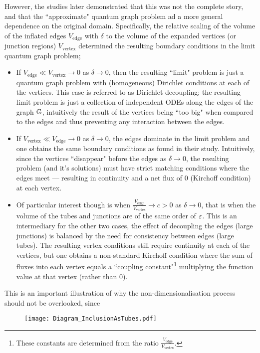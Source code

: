 However, the studies  later demonstrated that this was not the complete story, and that the ``approximate" quantum graph problem ad a more general dependence on the original domain.
Specifically, the relative scaling of the volume of the inflated edges $V_{\mathrm{edge}}$ with $\delta$ to the volume of the expanded vertices (or junction regions) $V_{\mathrm{vertex}}$ determined the resulting boundary conditions in the limit quantum graph problem;
\begin{itemize}
	\item If $V_{\mathrm{edge}}\ll V_{\mathrm{vertex}}\rightarrow0$ as $\delta\rightarrow0$, then the resulting ``limit" problem is just a quantum graph problem with (homogeneous) Dirichlet conditions at each of the vertices.
	This case is referred to as Dirichlet decoupling; the resulting limit problem is just a collection of independent ODEs along the edges of the graph $\mathbb{G}$, intuitively the result of the vertices being ``too big" when compared to the edges and thus preventing any interaction between the edges.
	\item If $V_{\mathrm{vertex}}\ll V_{\mathrm{edge}}\rightarrow0$ as $\delta\rightarrow0$, the edges dominate in the limit problem and one obtains the same boundary conditions as  found in their study.
	Intuitively, since the vertices ``disappear" before the edges as $\delta\rightarrow0$, the resulting problem (and it's solutions) must have strict matching conditions where the edges meet --- resulting in continuity and a net flux of 0 (Kirchoff condition) at each vertex.
	\item Of particular interest though is when $\frac{V_{\mathrm{edge}}}{V_{\mathrm{vertex}}}\rightarrow c>0$ as $\delta\rightarrow0$, that is when the volume of the tubes and junctions are of the same order of $\varepsilon$.
	This is an intermediary for the other two cases, the effect of decoupling the edges (large junctions) is balanced by the need for consistency between edges (large tubes).
	The resulting vertex conditions still require continuity at each of the vertices, but one obtains a non-standard Kirchoff condition where the sum of fluxes into each vertex equals a ``coupling constant"\footnote{These constants are determined from the ratio $\frac{V_{\mathrm{edge}}}{V_{\mathrm{vertex}}}$.} multiplying the function value at that vertex (rather than 0).
\end{itemize}
This is an important illustration of why the non-dimensionalisation process should not be overlooked, since 
\begin{figure}[h]
	\centering
	\texttt{[image: Diagram\_InclusionAsTubes.pdf]}
	\caption{\label{fig:Diagram_InclusionAsTubes}}
\end{figure}

